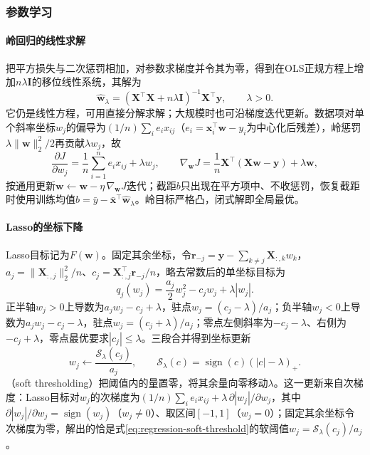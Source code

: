 \subsubsection{参数学习}
\label{sec:regression-regularization-learning}

\paragraph{岭回归的线性求解}

把平方损失与二次惩罚相加，对参数求梯度并令其为零，得到在OLS正规方程上增加$n\lambda\bm{I}$的移位线性系统，其解为
\begin{equation}
  \widehat{\bm{w}}_{\lambda}
  =(\bm{X}^{\top}\bm{X}+n\lambda\bm{I})^{-1}\bm{X}^{\top}\bm{y},
  \qquad\lambda>0.
  \label{eq:regression-ridge-solution}
\end{equation}
它仍是线性方程，可用直接分解求解；大规模时也可沿梯度迭代更新。数据项对单个斜率坐标$w_j$的偏导为$(1/n)\sum_i e_i x_{ij}$（$e_i=\bm{x}_i^{\top}\bm{w}-y_i$为中心化后残差），岭惩罚$\lambda\lVert\bm{w}\rVert_2^2/2$再贡献$\lambda w_j$，故
\[
  \frac{\partial J}{\partial w_j}
  =\frac1n\sum_{i=1}^n e_i x_{ij}+\lambda w_j,
  \qquad
  \nabla_{\bm w}J=\frac1n\bm{X}^{\top}(\bm{X}\bm{w}-\bm{y})+\lambda\bm{w},
\]
按通用更新$\bm w\leftarrow\bm w-\eta\,\nabla_{\bm w}J$迭代；截距$b$只出现在平方项中、不收惩罚，恢复截距时使用训练均值$\widehat b=\bar y-\bar{\bm{x}}^{\top}\widehat{\bm{w}}_{\lambda}$。岭目标严格凸，闭式解即全局最优。

\paragraph{Lasso的坐标下降}

Lasso目标记为$F(\bm{w})$。固定其余坐标，令$\bm{r}_{-j}=\bm{y}-\sum_{k\ne j}\bm{X}_{:,k}w_k$，$a_j=\lVert\bm{X}_{:,j}\rVert_2^2/n$、$c_j=\bm{X}_{:,j}^{\top}\bm{r}_{-j}/n$，略去常数后的单坐标目标为
\[
  q_j(w_j)=\frac{a_j}{2}w_j^2-c_jw_j+\lambda|w_j|.
\]
正半轴$w_j>0$上导数为$a_jw_j-c_j+\lambda$，驻点$w_j=(c_j-\lambda)/a_j$；负半轴$w_j<0$上导数为$a_jw_j-c_j-\lambda$，驻点$w_j=(c_j+\lambda)/a_j$；零点左侧斜率为$-c_j-\lambda$、右侧为$-c_j+\lambda$，零点最优要求$|c_j|\leq\lambda$。三段合并得到坐标更新
\begin{equation}
  w_j\leftarrow\frac{\mathcal{S}_{\lambda}(c_j)}{a_j},
  \qquad
  \mathcal{S}_{\lambda}(c)=\operatorname{sign}(c)(|c|-\lambda)_+.
  \label{eq:regression-soft-threshold}
\end{equation}
（soft thresholding）把阈值内的量置零，将其余量向零移动$\lambda$。这一更新来自次梯度：Lasso目标对$w_j$的次梯度为$(1/n)\sum_i e_i x_{ij}+\lambda\,\partial|w_j|/\partial w_j$，其中$\partial|w_j|/\partial w_j=\operatorname{sign}(w_j)$（$w_j\ne0$）、取区间$[-1,1]$（$w_j=0$）；固定其余坐标令次梯度为零，解出的恰是式\eqref{eq:regression-soft-threshold}的软阈值$w_j=\mathcal S_\lambda(c_j)/a_j$。

